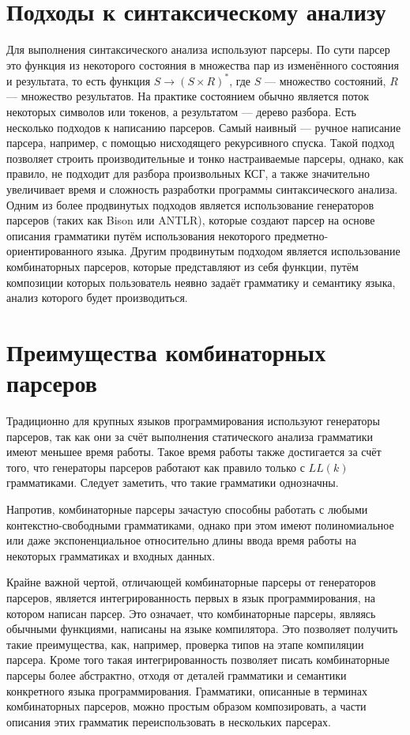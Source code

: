 \documentclass[times]{itmo-student-thesis}
\begin{document}
\section{Подходы к синтаксическому анализу}\label{sec:parsing_approaches}

Для выполнения синтаксического анализа используют парсеры. По сути парсер это функция из некоторого состояния в
множества пар из изменённого состояния и результата, то есть функция $S \rightarrow (S \times R)^*$, где $S$
--- множество состояний, $R$ --- множество результатов. На практике состоянием обычно является поток
некоторых символов или токенов, а результатом --- дерево разбора. Есть несколько подходов к написанию парсеров. Самый
наивный --- ручное написание парсера, например, с помощью нисходящего рекурсивного спуска. Такой подход позволяет
строить производительные и тонко настраиваемые парсеры, однако, как правило, не подходит для разбора произвольных КСГ,
а также значительно увеличивает время и сложность разработки программы синтаксического анализа. Одним из более
продвинутых подходов является использование генераторов парсеров (таких как Bison\cite{bison} или
ANTLR\cite{antlr}), которые создают парсер на основе описания грамматики путём использования некоторого
предметно-ориентированного языка. Другим продвинутым подходом является использование комбинаторных парсеров, которые
представляют из себя функции, путём композиции которых пользователь неявно задаёт грамматику и семантику языка, анализ
которого будет производиться.

\section{Преимущества комбинаторных парсеров}\label{sec:parser_combinators_advantages}

Традиционно для крупных языков программирования используют генераторы парсеров, так как они за счёт выполнения
статического анализа грамматики имеют меньшее время работы. Такое время работы также достигается за счёт того, что
генераторы парсеров работают как правило только с $LL(k)$ грамматиками. Следует заметить, что такие
грамматики однозначны.

Напротив, комбинаторные парсеры зачастую способны работать с любыми контекстно-свободными грамматиками, однако при этом
имеют полиномиальное или даже экспоненциальное относительно длины ввода время работы на некоторых грамматиках и входных
данных.

Крайне важной чертой, отличающей  комбинаторные парсеры от генераторов парсеров, является интегрированность первых в
язык программирования, на котором написан парсер. Это означает, что комбинаторные парсеры, являясь обычными функциями,
написаны на языке компилятора. Это позволяет получить такие преимущества, как, например, проверка типов на этапе
компиляции парсера. Кроме того такая интегрированность позволяет писать комбинаторные парсеры более абстрактно, отходя
от деталей грамматики и семантики конкретного языка программирования. Грамматики, описанные в терминах комбинаторных
парсеров, можно простым образом композировать, а части описания этих грамматик переиспользовать в нескольких парсерах.
\end{document}
